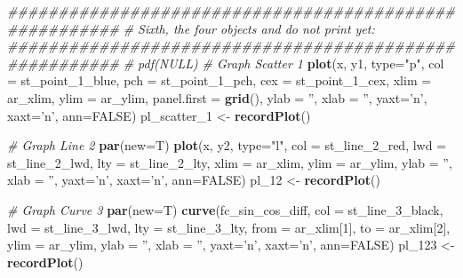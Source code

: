 \documentclass[
]{book}
\newenvironment{Shaded}{\begin{snugshade}}{\end{snugshade}}
\newcommand{\CommentTok}[1]{\textcolor[rgb]{0.56,0.35,0.01}{\textit{#1}}}
\newcommand{\DataTypeTok}[1]{\textcolor[rgb]{0.13,0.29,0.53}{#1}}
\newcommand{\DecValTok}[1]{\textcolor[rgb]{0.00,0.00,0.81}{#1}}
\newcommand{\KeywordTok}[1]{\textcolor[rgb]{0.13,0.29,0.53}{\textbf{#1}}}
\newcommand{\NormalTok}[1]{#1}
\newcommand{\OtherTok}[1]{\textcolor[rgb]{0.56,0.35,0.01}{#1}}
\newcommand{\StringTok}[1]{\textcolor[rgb]{0.31,0.60,0.02}{#1}}
\begin{document}
\begin{Shaded}
\begin{Highlighting}[]
\CommentTok{#######################################################}
\CommentTok{# Sixth, the four objects and do not print yet:}
\CommentTok{#######################################################}
\CommentTok{# pdf(NULL)}
\CommentTok{# Graph Scatter 1}
\KeywordTok{plot}\NormalTok{(x, y1, }\DataTypeTok{type=}\StringTok{"p"}\NormalTok{,}
     \DataTypeTok{col =}\NormalTok{ st_point_}\DecValTok{1}\NormalTok{_blue,}
     \DataTypeTok{pch =}\NormalTok{ st_point_}\DecValTok{1}\NormalTok{_pch, }\DataTypeTok{cex =}\NormalTok{ st_point_}\DecValTok{1}\NormalTok{_cex,}
     \DataTypeTok{xlim =}\NormalTok{ ar_xlim, }\DataTypeTok{ylim =}\NormalTok{ ar_ylim,}
     \DataTypeTok{panel.first =} \KeywordTok{grid}\NormalTok{(),}
     \DataTypeTok{ylab =} \StringTok{''}\NormalTok{, }\DataTypeTok{xlab =} \StringTok{''}\NormalTok{, }\DataTypeTok{yaxt=}\StringTok{'n'}\NormalTok{, }\DataTypeTok{xaxt=}\StringTok{'n'}\NormalTok{, }\DataTypeTok{ann=}\OtherTok{FALSE}\NormalTok{)}
\NormalTok{pl_scatter_}\DecValTok{1}\NormalTok{ <-}\StringTok{ }\KeywordTok{recordPlot}\NormalTok{()}

\CommentTok{# Graph Line 2}
\KeywordTok{par}\NormalTok{(}\DataTypeTok{new=}\NormalTok{T)}
\KeywordTok{plot}\NormalTok{(x, y2, }\DataTypeTok{type=}\StringTok{"l"}\NormalTok{,}
     \DataTypeTok{col =}\NormalTok{ st_line_}\DecValTok{2}\NormalTok{_red,}
     \DataTypeTok{lwd =}\NormalTok{ st_line_}\DecValTok{2}\NormalTok{_lwd, }\DataTypeTok{lty =}\NormalTok{ st_line_}\DecValTok{2}\NormalTok{_lty,}
     \DataTypeTok{xlim =}\NormalTok{ ar_xlim, }\DataTypeTok{ylim =}\NormalTok{ ar_ylim,}
     \DataTypeTok{ylab =} \StringTok{''}\NormalTok{, }\DataTypeTok{xlab =} \StringTok{''}\NormalTok{, }\DataTypeTok{yaxt=}\StringTok{'n'}\NormalTok{, }\DataTypeTok{xaxt=}\StringTok{'n'}\NormalTok{, }\DataTypeTok{ann=}\OtherTok{FALSE}\NormalTok{)}
\NormalTok{pl_}\DecValTok{12}\NormalTok{ <-}\StringTok{ }\KeywordTok{recordPlot}\NormalTok{()}

\CommentTok{# Graph Curve 3}
\KeywordTok{par}\NormalTok{(}\DataTypeTok{new=}\NormalTok{T)}
\KeywordTok{curve}\NormalTok{(fc_sin_cos_diff,}
      \DataTypeTok{col =}\NormalTok{ st_line_}\DecValTok{3}\NormalTok{_black,}
      \DataTypeTok{lwd =}\NormalTok{ st_line_}\DecValTok{3}\NormalTok{_lwd, }\DataTypeTok{lty =}\NormalTok{ st_line_}\DecValTok{3}\NormalTok{_lty,}
      \DataTypeTok{from =}\NormalTok{ ar_xlim[}\DecValTok{1}\NormalTok{], }\DataTypeTok{to =}\NormalTok{ ar_xlim[}\DecValTok{2}\NormalTok{], }\DataTypeTok{ylim =}\NormalTok{ ar_ylim,}
      \DataTypeTok{ylab =} \StringTok{''}\NormalTok{, }\DataTypeTok{xlab =} \StringTok{''}\NormalTok{, }\DataTypeTok{yaxt=}\StringTok{'n'}\NormalTok{, }\DataTypeTok{xaxt=}\StringTok{'n'}\NormalTok{, }\DataTypeTok{ann=}\OtherTok{FALSE}\NormalTok{)}
\NormalTok{pl_}\DecValTok{123}\NormalTok{ <-}\StringTok{ }\KeywordTok{recordPlot}\NormalTok{()}


\end{Highlighting}
\end{Shaded}
\end{document}
